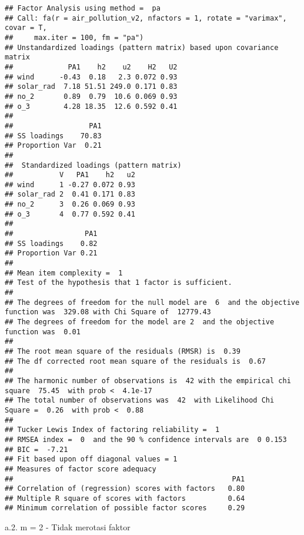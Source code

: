 \documentclass[
]{article}
\newenvironment{Shaded}{\begin{snugshade}}{\end{snugshade}}
\newcommand{\FunctionTok}[1]{\textcolor[rgb]{0.00,0.00,0.00}{#1}}
\newcommand{\NormalTok}[1]{#1}
\newcommand{\OtherTok}[1]{\textcolor[rgb]{0.56,0.35,0.01}{#1}}
\newcommand{\SpecialCharTok}[1]{\textcolor[rgb]{0.00,0.00,0.00}{#1}}
\begin{document}
\begin{verbatim}
## Factor Analysis using method =  pa
## Call: fa(r = air_pollution_v2, nfactors = 1, rotate = "varimax", covar = T, 
##     max.iter = 100, fm = "pa")
## Unstandardized loadings (pattern matrix) based upon covariance matrix
##             PA1    h2    u2    H2   U2
## wind      -0.43  0.18   2.3 0.072 0.93
## solar_rad  7.18 51.51 249.0 0.171 0.83
## no_2       0.89  0.79  10.6 0.069 0.93
## o_3        4.28 18.35  12.6 0.592 0.41
## 
##                  PA1
## SS loadings    70.83
## Proportion Var  0.21
## 
##  Standardized loadings (pattern matrix)
##           V   PA1    h2   u2
## wind      1 -0.27 0.072 0.93
## solar_rad 2  0.41 0.171 0.83
## no_2      3  0.26 0.069 0.93
## o_3       4  0.77 0.592 0.41
## 
##                 PA1
## SS loadings    0.82
## Proportion Var 0.21
## 
## Mean item complexity =  1
## Test of the hypothesis that 1 factor is sufficient.
## 
## The degrees of freedom for the null model are  6  and the objective function was  329.08 with Chi Square of  12779.43
## The degrees of freedom for the model are 2  and the objective function was  0.01 
## 
## The root mean square of the residuals (RMSR) is  0.39 
## The df corrected root mean square of the residuals is  0.67 
## 
## The harmonic number of observations is  42 with the empirical chi square  75.45  with prob <  4.1e-17 
## The total number of observations was  42  with Likelihood Chi Square =  0.26  with prob <  0.88 
## 
## Tucker Lewis Index of factoring reliability =  1
## RMSEA index =  0  and the 90 % confidence intervals are  0 0.153
## BIC =  -7.21
## Fit based upon off diagonal values = 1
## Measures of factor score adequacy             
##                                                    PA1
## Correlation of (regression) scores with factors   0.80
## Multiple R square of scores with factors          0.64
## Minimum correlation of possible factor scores     0.29
\end{verbatim}

a.2. m = 2 - Tidak merotasi faktor

\begin{Shaded}
\end{Shaded}
\end{document}
